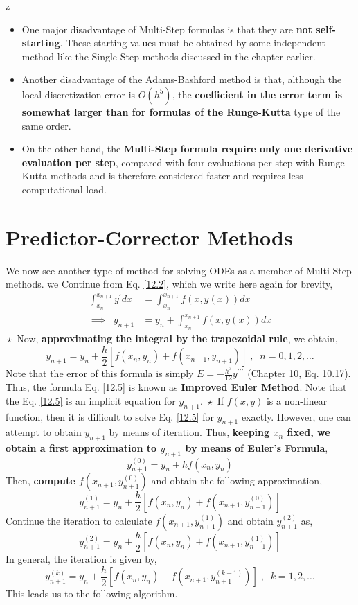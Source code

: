 z\documentclass[a4paper,12pt,twoside]{book}
\newcommand{\nll}[0]{\newline\newline}
\renewcommand{\d}[0]{\prime}
\begin{document}
\begin{itemize}
    \item {One major disadvantage of Multi-Step formulas is that they are \textbf{not self-starting}. These starting values must be obtained by some independent method like the Single-Step methods discussed in the chapter earlier.}
    \item{Another disadvantage of the Adams-Bashford method is that, although the local discretization error is $O(h^5)$, the\textbf{ coefficient in the error term is somewhat larger than for formulas of the Runge-Kutta} type of the same order.}
    \item{On the other hand, the \textbf{Multi-Step formula require only one derivative evaluation per step}, compared with four evaluations per  step with Runge-Kutta methods and is therefore considered faster and requires less computational load.}
\end{itemize}
\section{Predictor-Corrector Methods}
We now see another type of method for solving ODEs as a member of Multi-Step methods. we Continue from Eq. \ref{12.2}, which we write here again for brevity,
\begin{equation*}
    \begin{split}
        \int_{x_n}^{x_{n+1}} y^\d dx &= \int_{x_n}^{x_{n+1}} f(x,y(x))dx\\
        \implies\;\;y_{n+1} &= y_n + \int_{x_n}^{x_{n+1}} f(x,y(x))dx
    \end{split}
\end{equation*}
$\boxed{\star}$ Now, \textbf{approximating the integral by the trapezoidal rule}, we obtain,
\begin{equation}
\label{12.5}
    y_{n+1} = y_n + \frac{h}{2} \left[ f(x_n,y_n) + f(x_{n+1},y_{n+1}) \right]\;,\;\;n=0,1,2,\dots
\end{equation}
Note that the error of this formula is simply $E = -\frac{h^3}{12}y^{\d\d\d}$ (Chapter 10, Eq. 10.17). Thus, the formula Eq. \ref{12.5} is known as \textbf{Improved Euler Method}.
\nll
Note that the Eq. \ref{12.5} is an implicit equation for $y_{n+1}$.
\nll
$\boxed{\star}$ If $f(x,y)$ is a non-linear function, then it is difficult to solve Eq. \ref{12.5} for $y_{n+1}$ exactly. However, one can attempt to obtain $y_{n+1}$ by means of iteration. Thus,\textbf{ keeping $x_n$ fixed, we obtain a first approximation to $y_{n+1}$ by means of Euler's Formula},
\[y^{(0)}_{n+1} = y_n + hf(x_n,y_n)\]
Then, \textbf{compute $f(x_{n+1}, y_{n+1}^{(0)})$} and obtain the following approximation,
\[y_{n+1}^{(1)} = y_n + \frac{h}{2} \left[ f(x_n,y_n) + f(x_{n+1}, y_{n+1}^{(0)}) \right]\]
Continue the iteration to calculate $f(x_{n+1}, y_{n+1}^{(1)})$ and obtain $y_{n+1}^{(2)}$ as,
\[ y_{n+1}^{(2)} = y_n + \frac{h}{2}\left[ f(x_n,y_n) + f(x_{n+1}, y_{n+1}^{(1)}) \right]  \]
In general, the iteration is given by,
\[ y_{n+1}^{(k)} = y_n + \frac{h}{2} \left[ f(x_n,y_n) + f(x_{n+1},y_{n+1}^{(k-1)}) \right]\;,\;\;k=1,2,\dots \]
This leads us to the following algorithm.
\end{document}
